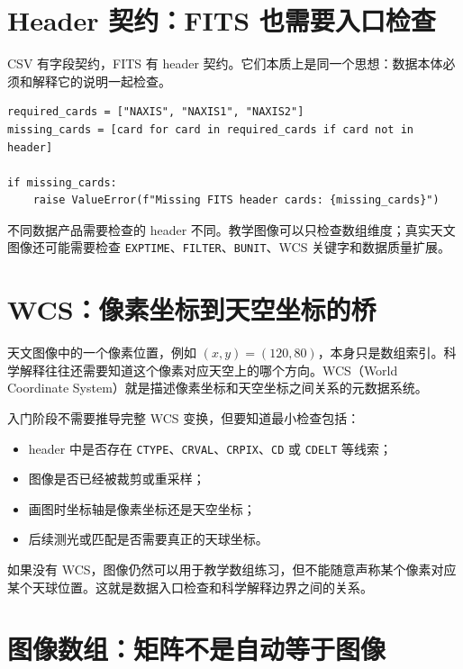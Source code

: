 \section{Header 契约：FITS 也需要入口检查}

CSV 有字段契约，FITS 有 header 契约。它们本质上是同一个思想：数据本体必须和解释它的说明一起检查。

\begin{examplebox}
\begin{lstlisting}[style=pythonstyle]
required_cards = ["NAXIS", "NAXIS1", "NAXIS2"]
missing_cards = [card for card in required_cards if card not in header]

if missing_cards:
    raise ValueError(f"Missing FITS header cards: {missing_cards}")
\end{lstlisting}
\end{examplebox}

不同数据产品需要检查的 header 不同。教学图像可以只检查数组维度；真实天文图像还可能需要检查 \texttt{EXPTIME}、\texttt{FILTER}、\texttt{BUNIT}、WCS 关键字和数据质量扩展。

\section{WCS：像素坐标到天空坐标的桥}

天文图像中的一个像素位置，例如 \((x,y)=(120,80)\)，本身只是数组索引。科学解释往往还需要知道这个像素对应天空上的哪个方向。WCS（World Coordinate System）就是描述像素坐标和天空坐标之间关系的元数据系统。

入门阶段不需要推导完整 WCS 变换，但要知道最小检查包括：

\begin{itemize}
    \item header 中是否存在 \texttt{CTYPE}、\texttt{CRVAL}、\texttt{CRPIX}、\texttt{CD} 或 \texttt{CDELT} 等线索；
    \item 图像是否已经被裁剪或重采样；
    \item 画图时坐标轴是像素坐标还是天空坐标；
    \item 后续测光或匹配是否需要真正的天球坐标。
\end{itemize}

如果没有 WCS，图像仍然可以用于教学数组练习，但不能随意声称某个像素对应某个天球位置。这就是数据入口检查和科学解释边界之间的关系。

\section{图像数组：矩阵不是自动等于图像}

